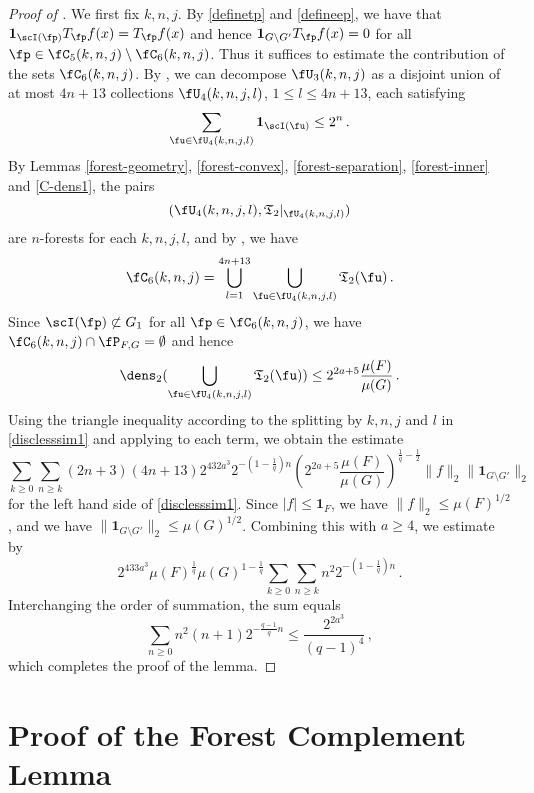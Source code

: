 \begin{proof}[Proof of ]

    We first fix $k,n, j$.
    By \eqref{definetp} and \eqref{defineep}, we have that
    $\mathbf{1}_{\scI(\fp)} T_{\fp}f(x) = T_{\fp}f(x)$ and hence $\mathbf{1}_{G \setminus G'} T_{\fp}f(x)= 0$ for all $\fp \in \fC_5(k,n,j) \setminus \fC_6(k,n,j)$.
    Thus it suffices to estimate the contribution of the sets $\fC_6(k,n,j)$. By , we can decompose $\fU_3(k,n,j)$ as a disjoint union of at most $4n + 13$ collections $\fU_4(k,n,j,l)$, $1 \le l \le 4n+13$, each satisfying
    $$
        \sum_{\fu \in \fU_4(k,n,j,l)} \mathbf{1}_{\scI(\fu)} \le 2^n\,.
    $$
    By Lemmas \ref{forest-geometry}, \ref{forest-convex}, \ref{forest-separation}, \ref{forest-inner} and \ref{C-dens1}, the pairs
    $$
        (\fU_4(k,n,j,l), \mathfrak{T}_2|_{\fU_4(k,n,j,l)})
    $$
    are $n$-forests for each $k,n,j,l$, and by , we have
    $$
        \fC_6(k,n,j) = \bigcup_{l = 1}^{4n + 13} \bigcup_{\fu \in \fU_4(k,n,j,l)} \mathfrak{T}_2(\fu)\,.
    $$
    Since $\scI(\fp) \not\subset G_1$ for all $\fp \in \fC_6(k,n,j)$, we have $\fC_6(k,n,j) \cap \fP_{F,G} = \emptyset$ and hence
    $$
        \dens_2(\bigcup_{\fu \in \fU_4(k,n,j,l)} \mathfrak{T}_2(\fu)) \le 2^{2a + 5} \frac{\mu(F)}{\mu(G)}\,.
    $$
    Using the triangle inequality according to the splitting by $k,n,j$ and $l$ in \eqref{disclesssim1} and applying  to each term, we obtain the estimate
    $$
        \sum_{k \ge 0}\sum_{n \ge k} (2n+3)(4n+13) 2^{432a^3}2^{-(1-\frac{1}{q})n}(2^{2a+5} \frac{\mu(F)}{\mu(G)})^{\frac{1}{q} - \frac{1}{2}} \|f\|_2 \|\mathbf{1}_{G\setminus G'}\|_2
    $$
    for the left hand side of \eqref{disclesssim1}. Since $|f| \le \mathbf{1}_F$, we have $\|f\|_2 \le \mu(F)^{1/2}$, and we have $\|\mathbf{1}_{G\setminus G'}\|_2 \le \mu(G)^{1/2}$. Combining this with $a \ge 4$, we estimate by
    $$
        2^{433a^3} \mu(F)^{\frac{1}{q}} \mu(G)^{1
        -\frac{1}{q}} \sum_{k \ge 0}\sum_{n \ge k}n^2 2^{-(1-\frac{1}{q})n}\,.
    $$ %
    Interchanging the order of summation, the sum equals
    $$
        \sum_{n \ge 0} n^2(n+1) 2^{-\frac{q-1}{q}n} \le \frac{2^{2a^3}}{(q-1)^4}\,,
    $$
    which completes the proof of the lemma.
\end{proof}

\section{Proof of the Forest Complement Lemma}
\label{subsecantichain}


